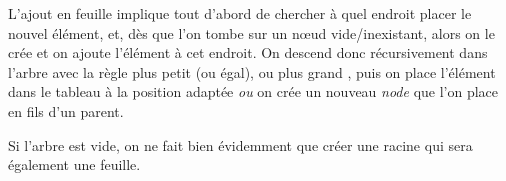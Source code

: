 \documentclass[11pt,a4paper]{article}
\begin{document}

\medskip

L'ajout en feuille implique tout d'abord de chercher à quel endroit placer le nouvel élément, et, dès que l'on tombe sur un nœud vide/inexistant, alors on le crée et on ajoute l'élément à cet endroit.
On descend donc récursivement dans l'arbre avec la règle \og plus petit (ou égal), ou plus grand \fg{}, puis on place l'élément dans le tableau à la position adaptée \textit{ou} on crée un nouveau \textit{node} que l'on place en fils d'un parent.

Si l'arbre est vide, on ne fait bien évidemment que créer une racine qui sera également une feuille.

\medskip
\end{document}

